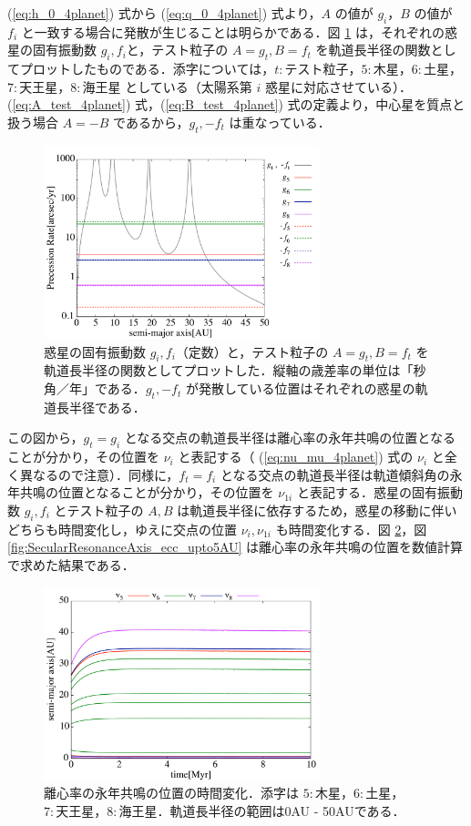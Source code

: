 \documentclass[11pt,a4paper,oneside,onecolumn]{jreport}
\begin{document}
(\ref{eq:h_0_4planet}) 式から (\ref{eq:q_0_4planet}) 式より，$A$ の値が $g_i$，$B$ の値が $f_i$ と一致する場合に発散が生じることは明らかである．図 \ref{fig:PrecessionRate} は，それぞれの惑星の固有振動数 $g_i, f_i$と，テスト粒子の $A = g_t, B = f_t$ を軌道長半径の関数としてプロットしたものである．添字については，$t : テスト粒子$，$5 : 木星$，$6 : 土星$，$7 : 天王星$，$8 : 海王星$ としている（太陽系第 $i$ 惑星に対応させている）．(\ref{eq:A_test_4planet}) 式，(\ref{eq:B_test_4planet}) 式の定義より，中心星を質点と扱う場合 $A = - B$ であるから，$g_t, - f_t$ は重なっている．
\begin{figure}[H]
\centering
\includegraphics[width=8cm]{./image/PrecessionRate_logAB.pdf}
\caption{惑星の固有振動数 $g_i, f_i$（定数）と，テスト粒子の $A = g_t, B = f_t$ を軌道長半径の関数としてプロットした．縦軸の歳差率の単位は「秒角／年」である．$g_t, - f_t$ が発散している位置はそれぞれの惑星の軌道長半径である．\label{fig:PrecessionRate}}
\end{figure}
この図から，$g_t = g_i$ となる交点の軌道長半径は離心率の永年共鳴の位置となることが分かり，その位置を $\nu_i$ と表記する（ (\ref{eq:nu_mu_4planet}) 式の $\nu_i$ と全く異なるので注意）．同様に，$f_t = f_i$ となる交点の軌道長半径は軌道傾斜角の永年共鳴の位置となることが分かり，その位置を $\nu_{1i}$ と表記する．惑星の固有振動数 $g_i, f_i$ とテスト粒子の $A, B$ は軌道長半径に依存するため，惑星の移動に伴いどちらも時間変化し，ゆえに交点の位置 $\nu_i, \nu_{1i}$ も時間変化する．図 \ref{fig:SecularResonanceAxis_ecc}，図 \ref{fig:SecularResonanceAxis_ecc_upto5AU} は離心率の永年共鳴の位置を数値計算で求めた結果である．
\begin{figure}[H]
\centering
\includegraphics[width=8cm]{./image/SecularResonanceAxis_ecc.pdf}
\caption{離心率の永年共鳴の位置の時間変化．添字は $5 : 木星$，$6 : 土星$，$7 : 天王星$，$8 : 海王星$．軌道長半径の範囲は0AU - 50AUである．\label{fig:SecularResonanceAxis_ecc}}
\end{figure}
\end{document}
